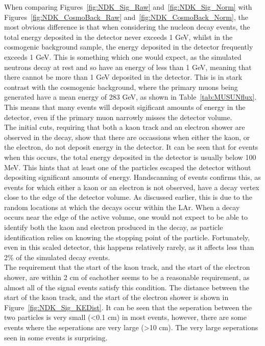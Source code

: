 When comparing Figures~\ref{fig:NDK_Sig_Raw} and~\ref{fig:NDK_Sig_Norm} with Figures~\ref{fig:NDK_CosmoBack_Raw} and~\ref{fig:NDK_CosmoBack_Norm}, the most obvious difference is that when considering the nucleon decay events, the total energy deposited in the detector never exceeds 1 GeV, whilst in the cosmogenic background sample, the energy deposited in the detector frequently exceeds 1 GeV. This is something which one would expect, as the simulated neutrons decay at rest and so have an energy of less than 1 GeV, meaning that there cannot be more than 1 GeV deposited in the detector. This is in stark contrast with the cosmogenic background, where the primary muons being generated have a mean energy of 283 GeV, as shown in Table~\ref{tab:MUSUNflux}. This means that many events will deposit sigificant amounts of energy in the detector, even if the primary muon narrowly misses the detector volume. \\

The initial cuts, requiring that both a kaon track and an electron shower are observed in the decay, show that there are occassions when either the kaon, or the electron, do not deposit energy in the detector. It can be seen that for events when this occurs, the total energy deposited in the detector is usually below 100 MeV. This hints that at least one of the particles escaped the detector without depositing significant amounts of energy. Handscanning of events confirms this, as events for which either a kaon or an electron is not observed, have a decay vertex close to the edge of the detector volume. As discussed earlier, this is due to the random locations at which the decays occur within the LAr. When a decay occurs near the edge of the active volume, one would not expect to be able to identify both the kaon and electron produced in the decay, as particle identification relies on knowing the stopping point of the particle. Fortunately, even in this scaled detector, this happens relatively rarely, as it affects less than 2\% of the simulated decay events. \\

The requirement that the start of the kaon track, and the start of the electron shower, are within 2 cm of eachother seems to be a reasonable requirement, as almost all of the signal events satisfy this condition. The distance between the start of the kaon track, and the start of the electron shower is shown in Figure~\ref{fig:NDK_Sig_KEDist}. It can be seen that the seperation between the two particles is very small (<0.1 cm) in most events, however, there are some events where the seperations are very large (>10 cm). The very large seperations seen in some events is surprising. 


